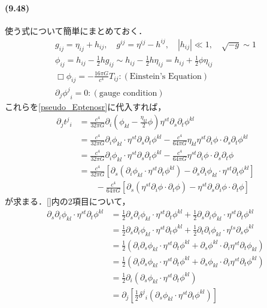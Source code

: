 \documentclass[a4paper]{ltjsreport}
\begin{document}
\paragraph{(9.48)}
使う式について簡単にまとめておく．
\begin{align*}
  g_{ij}=\eta_{ij} + h_{ij}, \quad{}g^{ij}=\eta^{ij} - h^{ij}, \quad{}|h_{ij}|\ll1, \quad{}\sqrt{ - g}\sim1\\
  \phi_{ij}=h_{ij} - \frac{1}{2}hg_{ij}\sim{}h_{ij} - \frac{1}{2}h\eta_{ij}=h_{ij} + \frac{1}{2}\phi\eta_{ij}\\
  \Box\phi_{ij}= - \frac{16\pi{G}}{c^4}T_{ij}\colon(\text{Einstein's Equation})\\
  \partial_j{\phi^j}_i=0\colon(\text{gauge condition})
\end{align*}
これらを\eqref{pseudo_Eptenosr}に代入すれば，
\begin{align*}
  \partial_j{t^j}_i &= \frac{c^4}{32\pi{G}}\partial_i\left(\phi_{kl} - \frac{\eta_{kl}}{2}\phi\right)\eta^{st}\partial_s\partial_t\phi^{kl}\\
  &= \frac{c^4}{32\pi{G}}\partial_i\phi_{kl}\cdot{}\eta^{st}\partial_s\partial_t\phi^{kl} - \frac{c^4}{64\pi{G}}\eta_{kl}\eta^{st}\partial_i\phi\cdot\partial_s\partial_t\phi^{kl}\\
  &= \frac{c^4}{32\pi{G}}\partial_i\phi_{kl}\cdot{}\eta^{st}\partial_s\partial_t\phi^{kl} - \frac{c^4}{64\pi{G}}\eta^{st}\partial_i\phi\cdot\partial_s\partial_t\phi\\
  &= \frac{c^4}{32\pi{G}}\left[\partial_s(\partial_i\phi_{kl}\cdot{}\eta^{st}\partial_t\phi^{kl}) - \partial_s\partial_i\phi_{kl}\cdot{}\eta^{st}\partial_t\phi^{kl}\right]\\
  &\qquad - \frac{c^4}{64\pi{G}}\left[\partial_s\left(\eta^{st}\partial_i\phi\cdot\partial_t\phi\right) - \eta^{st}\partial_s\partial_i\phi\cdot\partial_t\phi\right]
\end{align*}
が求まる．[]内の2項目について，
\begin{align*}
  \partial_s\partial_i\phi_{kl}\cdot{}\eta^{st}\partial_t\phi^{kl}
  &= \frac{1}{2}\partial_s\partial_i\phi_{kl}\cdot{}\eta^{st}\partial_t\phi^{kl} + \frac{1}{2}\partial_s\partial_i\phi_{kl}\cdot{}\eta^{st}\partial_t\phi^{kl}\\
  &= \frac{1}{2}\partial_s\partial_i\phi_{kl}\cdot{}\eta^{st}\partial_t\phi^{kl} + \frac{1}{2}\partial_t\partial_i\phi_{kl}\cdot{}\eta^{ts}\partial_s\phi^{kl}\\
  &= \frac{1}{2}\left(\partial_i\partial_s\phi_{kl}\cdot{}\eta^{st}\partial_t\phi^{kl} + \partial_s\phi^{kl}\cdot{}\partial_i\eta^{st}\partial_t\phi_{kl}\right)\\
  &= \frac{1}{2}\left(\partial_i\partial_s\phi_{kl}\cdot{}\eta^{st}\partial_t\phi^{kl} + \partial_s\phi_{kl}\cdot{}\partial_i\eta^{st}\partial_t\phi^{kl}\right)\\
  &= \frac{1}{2}\partial_i\left(\partial_s\phi_{kl}\cdot{}\eta^{st}\partial_t\phi^{kl}\right)\\
  &= \partial_j\left[\frac{1}{2}{\delta^j}_{i}\left(\partial_s\phi_{kl}\cdot{}\eta^{st}\partial_t\phi^{kl}\right)\right]
\end{align*}
\end{document}
